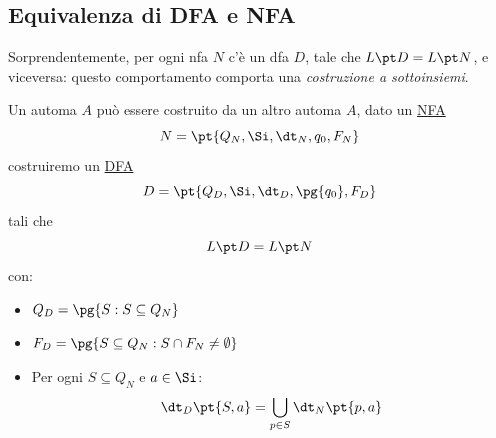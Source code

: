 \subsection{Equivalenza di DFA e NFA}\label{sub:lr_equivalenza_di_dfa_e_nfa} %
Sorprendentemente, per ogni \ac{nfa} $N$ c'è un \ac{dfa} $D$, tale che $L\pt D = L\pt N$, e viceversa: questo comportamento comporta una \textit{costruzione a sottoinsiemi}.
\begin{theorem}{}{}
    Un automa $A$ può essere costruito da un altro automa $A$, dato un \hyperref[sub:lr_automi_a_stati_finiti_non_deterministici]{NFA}
    \[
        N = \pt{Q_N,\Si,\dt_N,q_0,F_N}
    \]
    costruiremo un \hyperref[sub:lr_dfa]{DFA}
    \[
        D = \pt{Q_D,\Si,\dt_D,\pg{q_0},F_D}
    \]
    tali che
    \[
        L\pt D = L\pt N
    \]
    con:
    \begin{itemize}
        \item $Q_D = \pg{S:S\subseteq Q_N}$
        \item $F_D = \pg{S \subseteq Q_N : S \cap F_N \neq \emptyset}$
        \item Per ogni $S \subseteq Q_N$ e $a \in \Si$:
            \[
                \dt_D\pt{S,a} = \displaystyle\bigcup_{p\in S}\dt_N\pt{p,a}
            \]
    \end{itemize}
\end{theorem}
